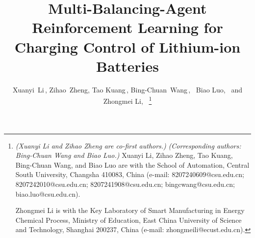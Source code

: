 \documentclass[10pt,journal,letterpaper]{IEEEtran}
\newif\ifTASEanonymous
\begin{document}
\title{Multi-Balancing-Agent Reinforcement Learning for Charging Control of Lithium-ion Batteries}


\ifTASEanonymous
\author{}
\else
\author{%
        Xuanyi~Li\,,
        Zihao~Zheng,
        Tao Kuang\,,
        Bing-Chuan~Wang\,,~
        Biao Luo,~
        and Zhongmei Li,~%
\thanks{{\emph{(Xuanyi Li and Zihao Zheng are co-first authors.)}}
        {\emph{(Corresponding authors: Bing-Chuan Wang and Biao Luo.)}}
        Xuanyi Li, Zihao Zheng, Tao Kuang, Bing-Chuan Wang, and Biao Luo are with the School of Automation, Central South University, Changsha 410083, China (e-mail: 8207240609@csu.edu.cn; 8207242010@csu.edu.cn; 8207241908@csu.edu.cn; bingcwang@csu.edu.cn; biao.luo@csu.edu.cn).

Zhongmei Li is with the Key Laboratory of Smart Manufacturing in Energy Chemical Process, Ministry of Education, East China University of Science and Technology, Shanghai 200237, China (e-mail: zhongmeili@ecust.edu.cn).
}
}
\fi
\end{document}

